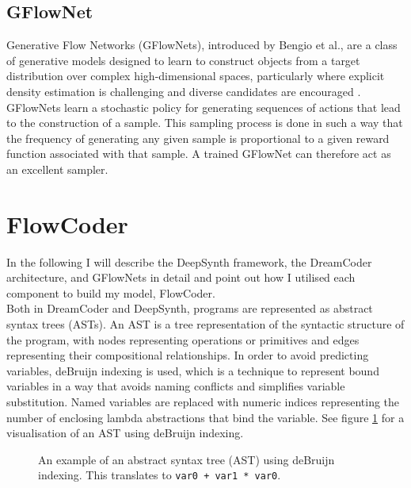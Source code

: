 \subsection{GFlowNet}
Generative Flow Networks (GFlowNets), introduced by Bengio et al., are a class of generative models designed to learn to construct objects from a target distribution over complex high-dimensional spaces, particularly where explicit density estimation is challenging and diverse candidates are encouraged \cite{bengio_flow_2021}. GFlowNets learn a stochastic policy for generating sequences of actions that lead to the construction of a sample. This sampling process is done in such a way that the frequency of generating any given sample is proportional to a given reward function associated with that sample. A trained GFlowNet can therefore act as an excellent sampler.











\section{FlowCoder}

In the following I will describe the DeepSynth framework, the DreamCoder architecture, and GFlowNets in detail and point out how I utilised each component to build my model, \textrm{FlowCoder}. \\


Both in DreamCoder and DeepSynth, programs are represented as abstract syntax trees (ASTs). An AST is a tree representation of the syntactic structure of the program, with nodes representing operations or primitives and edges representing their compositional relationships. In order to avoid predicting variables, deBruijn indexing is used, which is a technique to represent bound variables in a way that avoids naming conflicts and simplifies variable substitution. Named variables are replaced with numeric indices representing the number of enclosing lambda abstractions that bind the variable. See figure \ref{fig:AST} for a visualisation of an AST using deBruijn indexing.




\begin{figure}[H]
    \centering
    \caption{An example of an abstract syntax tree (AST) using deBruijn indexing. This translates to \texttt{var0 + var1 * var0}.}
    \label{fig:AST}
\end{figure}



